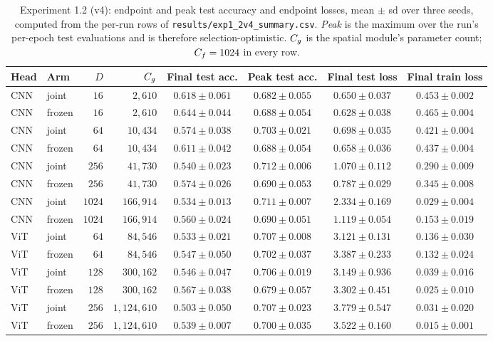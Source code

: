 \begin{table}[htbp]
\centering
\small
\setlength{\tabcolsep}{4pt}
\caption{Experiment 1.2 (v4): endpoint and peak test accuracy and endpoint
losses, mean $\pm$ sd over three seeds, computed from the per-run rows of
\texttt{results/exp1\_2v4\_summary.csv}. \emph{Peak} is the maximum over the
run's per-epoch test evaluations and is therefore selection-optimistic.
$C_g$ is the spatial module's parameter count; $C_f = 1024$ in every row.}
\label{tab:app_exp12v4}
\begin{tabular}{llrrcccc}
\toprule
Head & Arm & $D$ & $C_g$ & Final test acc. & Peak test acc. & Final test loss & Final train loss \\
\midrule
CNN & joint  & $16$   & $2{,}610$     & $0.618 \pm 0.061$ & $0.682 \pm 0.055$ & $0.650 \pm 0.037$ & $0.453 \pm 0.002$ \\
CNN & frozen & $16$   & $2{,}610$     & $0.644 \pm 0.044$ & $0.688 \pm 0.054$ & $0.628 \pm 0.038$ & $0.465 \pm 0.004$ \\
CNN & joint  & $64$   & $10{,}434$    & $0.574 \pm 0.038$ & $0.703 \pm 0.021$ & $0.698 \pm 0.035$ & $0.421 \pm 0.004$ \\
CNN & frozen & $64$   & $10{,}434$    & $0.611 \pm 0.042$ & $0.688 \pm 0.054$ & $0.658 \pm 0.036$ & $0.437 \pm 0.004$ \\
CNN & joint  & $256$  & $41{,}730$    & $0.540 \pm 0.023$ & $0.712 \pm 0.006$ & $1.070 \pm 0.112$ & $0.290 \pm 0.009$ \\
CNN & frozen & $256$  & $41{,}730$    & $0.574 \pm 0.026$ & $0.690 \pm 0.053$ & $0.787 \pm 0.029$ & $0.345 \pm 0.008$ \\
CNN & joint  & $1024$ & $166{,}914$   & $0.534 \pm 0.013$ & $0.711 \pm 0.007$ & $2.334 \pm 0.169$ & $0.029 \pm 0.004$ \\
CNN & frozen & $1024$ & $166{,}914$   & $0.560 \pm 0.024$ & $0.690 \pm 0.051$ & $1.119 \pm 0.054$ & $0.153 \pm 0.019$ \\
\midrule
ViT & joint  & $64$   & $84{,}546$    & $0.533 \pm 0.021$ & $0.707 \pm 0.008$ & $3.121 \pm 0.131$ & $0.136 \pm 0.030$ \\
ViT & frozen & $64$   & $84{,}546$    & $0.547 \pm 0.050$ & $0.702 \pm 0.037$ & $3.387 \pm 0.233$ & $0.132 \pm 0.024$ \\
ViT & joint  & $128$  & $300{,}162$   & $0.546 \pm 0.047$ & $0.706 \pm 0.019$ & $3.149 \pm 0.936$ & $0.039 \pm 0.016$ \\
ViT & frozen & $128$  & $300{,}162$   & $0.567 \pm 0.038$ & $0.679 \pm 0.057$ & $3.302 \pm 0.451$ & $0.025 \pm 0.010$ \\
ViT & joint  & $256$  & $1{,}124{,}610$ & $0.503 \pm 0.050$ & $0.707 \pm 0.023$ & $3.779 \pm 0.547$ & $0.031 \pm 0.020$ \\
ViT & frozen & $256$  & $1{,}124{,}610$ & $0.539 \pm 0.007$ & $0.700 \pm 0.035$ & $3.522 \pm 0.160$ & $0.015 \pm 0.001$ \\
\bottomrule
\end{tabular}
\end{table}

